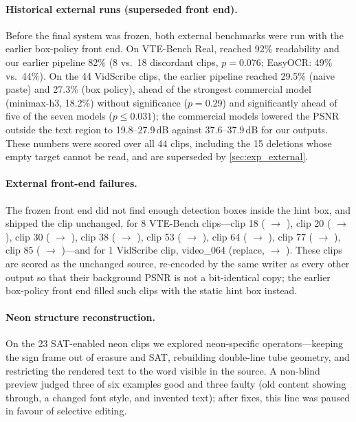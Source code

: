 \paragraph{Historical external runs (superseded front end).} Before the final system was frozen, both external benchmarks were run with the earlier box-policy front end. On VTE-Bench Real, \steer reached 92\% readability and our earlier pipeline 82\% (8 vs.\ 18 discordant clips, $p=0.076$; EasyOCR: 49\% vs.\ 44\%). On the 44 VidScribe clips, the earlier pipeline reached 29.5\% (naive paste) and 27.3\% (box policy), ahead of the strongest commercial model (minimax-h3, 18.2\%) without significance ($p=0.29$) and significantly ahead of five of the seven models ($p\le0.031$); the commercial models lowered the PSNR outside the text region to 19.8--27.9\,dB against 37.6--37.9\,dB for our outputs. These numbers were scored over all 44 clips, including the 15 deletions whose empty target cannot be read, and are superseded by \cref{sec:exp_external}.

\paragraph{External front-end failures.} The frozen front end did not find enough detection boxes inside the hint box, and shipped the clip unchanged, for 8 VTE-Bench clips---clip 18 ( $\to$ ), clip 20 ( $\to$ ), clip 30 ( $\to$ ), clip 38 ( $\to$ ), clip 53 ( $\to$ ), clip 64 ( $\to$ ), clip 77 ( $\to$ ), clip 85 ( $\to$ )---and for 1 VidScribe clip, video\_064 (replace,  $\to$ ). These clips are scored as the unchanged source, re-encoded by the same writer as every other output so that their background PSNR is not a bit-identical copy; the earlier box-policy front end filled such clips with the static hint box instead.

\paragraph{Neon structure reconstruction.} On the 23 SAT-enabled neon clips we explored neon-specific operators---keeping the sign frame out of erasure and SAT, rebuilding double-line tube geometry, and restricting the rendered text to the word visible in the source. A non-blind preview judged three of six examples good and three faulty (old content showing through, a changed font style, and invented text); after fixes, this line was paused in favour of selective editing.

